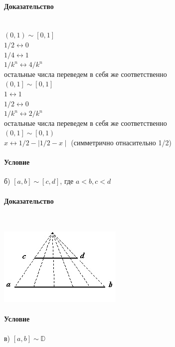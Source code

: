 \documentclass[a4paper,12pt]{article}
\begin{document}
\paragraph*{Доказательство}\mbox{}\\
$\left( 0, 1\right)  \sim \left[  0, 1 \right]$\\
$1/2 \leftrightarrow 0$\\
$1/4 \leftrightarrow 1$\\
$1/k^n \leftrightarrow 4/k^n$\\
остальные числа переведем в себя же соответственно\\
$\left(  0, 1 \right]  \sim \left[  0, 1 \right]$\\
$1 \leftrightarrow 1$\\
$1/2 \leftrightarrow 0$\\
$1/k^n \leftrightarrow 2/k^n$\\
остальные числа переведем в себя же соответственно\\
$\left(  0, 1 \right]  \sim \left[  0, 1 \right)$\\
$x \leftrightarrow 1/2 - \mid 1/2 - x \mid$ (симметрично отнасительно 1/2)
\paragraph*{Условие}
б) $\left[ a, b \right]  \sim \left[  c, d \right] $, где $a < b, c < d$\\
\paragraph*{Доказательство}\mbox{}\\
\begin{center}
  \includegraphics[scale=0.7]{image007.jpg}
\end{center}

\paragraph*{Условие}
в) $\left[ a, b \right] \sim \mathbb{D}$
\end{document}
